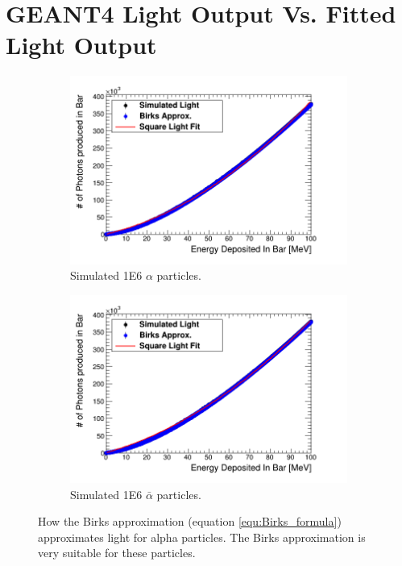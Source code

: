
\chapter{GEANT4 Light Output Vs. Fitted Light Output}

\begin{figure}[htbp]
\centering
\begin{subfigure}{.49\textwidth}
  \centering
  \includegraphics[width=\linewidth]{Appendix5/newFigs/alphaBirksSlab_simAndApproxLight.png}
  \captionsetup{width=.9\linewidth}
  \caption{Simulated 1E6 $\alpha$ particles.}
  \label{subfig:append5_light_of_Alphas0-100mev}
\end{subfigure}
\begin{subfigure}{.49\textwidth}
  \centering
  \includegraphics[width=\linewidth]{Appendix5/newFigs/aAlphaBirksSlab_simAndApproxLight.png}
  \captionsetup{width=.9\linewidth}
  \caption{Simulated 1E6 $\bar{\alpha}$ particles.}
  \label{subfig:append5_light_of_AAlphas0-100mev}
\end{subfigure}
\caption{How the Birks approximation (equation \ref{equ:Birks_formula}) approximates light for alpha particles. The Birks approximation is very suitable for these particles.}
\label{fig:append5_light_of_Alphas_AAlphas0-100mev}
\end{figure}

